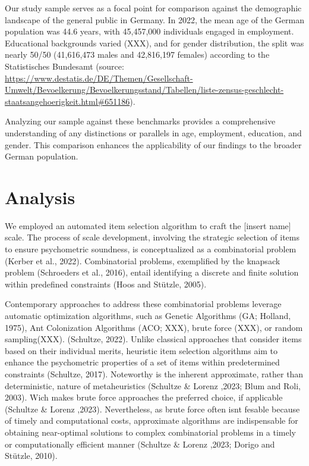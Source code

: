 \documentclass[
  12pt,
  a4paper,
  twoside]{article}
\begin{document}
Our study sample serves as a focal point for comparison against the demographic landscape of the general public in Germany. In 2022, the mean age of the German population was 44.6 years, with 45,457,000 individuals engaged in employment. Educational backgrounds varied (XXX), and for gender distribution, the split was nearly 50/50 (41,616,473 males and 42,816,197 females) according to the Statistisches Bundesamt (source: \url{https://www.destatis.de/DE/Themen/Gesellschaft-Umwelt/Bevoelkerung/Bevoelkerungsstand/Tabellen/liste-zensus-geschlecht-staatsangehoerigkeit.html\#651186}).

Analyzing our sample against these benchmarks provides a comprehensive understanding of any distinctions or parallels in age, employment, education, and gender. This comparison enhances the applicability of our findings to the broader German population.

\hypertarget{analysis}{%
\section{Analysis}\label{analysis}}

We employed an automated item selection algorithm to craft the {[}insert name{]} scale. The process of scale development, involving the strategic selection of items to ensure psychometric soundness, is conceptualized as a combinatorial problem (Kerber et al., 2022). Combinatorial problems, exemplified by the knapsack problem (Schroeders et al., 2016), entail identifying a discrete and finite solution within predefined constraints (Hoos and Stützle, 2005).

Contemporary approaches to address these combinatorial problems leverage automatic optimization algorithms, such as Genetic Algorithms (GA; Holland, 1975), Ant Colonization Algorithms (ACO; XXX), brute force (XXX), or random sampling(XXX). (Schultze, 2022).
Unlike classical approaches that consider items based on their individual merits, heuristic item selection algorithms aim to enhance the psychometric properties of a set of items within predetermined constraints (Schultze, 2017).
Noteworthy is the inherent approximate, rather than deterministic, nature of metaheuristics (Schultze \& Lorenz ,2023; Blum and Roli, 2003). Wich makes brute force approaches the preferred choice, if applicable (Schultze \& Lorenz ,2023). Nevertheless, as brute force often isnt fesable because of timely and computational costs, approximate algorithms are indispensable for obtaining near-optimal solutions to complex combinatorial problems in a timely or computationally efficient manner (Schultze \& Lorenz ,2023; Dorigo and Stützle, 2010).
\end{document}
